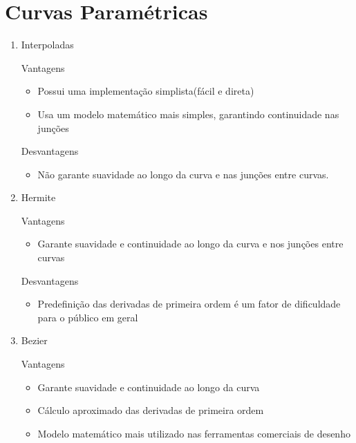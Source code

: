 \section*{Curvas Paramétricas}

	\begin{enumerate}\addtocounter{enumi}{9}
	
		\item Interpoladas
	
		Vantagens
		\begin{itemize}
			\item Possui uma implementação simplista(fácil e direta)
			
			\item Usa um modelo matemático mais simples, garantindo 
			continuidade nas junções 
		\end{itemize}				
		
		Desvantagens
		\begin{itemize}
			\item Não garante suavidade ao longo da curva e 
		nas junções entre curvas.
		\end{itemize}				

		\item Hermite 
		
		Vantagens
		\begin{itemize}
			\item Garante suavidade e continuidade ao longo da curva
			e nos junções entre curvas
		\end{itemize}				
		
		Desvantagens
		
		\begin{itemize}
			\item Predefinição das derivadas de primeira
			ordem é um fator de dificuldade para o 
			público em geral
		\end{itemize}			
		
		\item Bezier
		
		Vantagens
		\begin{itemize}
			\item Garante suavidade e continuidade ao longo da curva
			
			\item Cálculo aproximado das derivadas de primeira ordem 
			
			\item Modelo matemático mais utilizado nas ferramentas
			comerciais de desenho
		\end{itemize}				
		

\end{enumerate}
